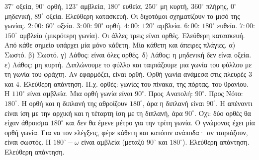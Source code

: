  $37^\circ$ οξεία, $90^\circ$ ορθή, $123^\circ$ αμβλεία, $180^\circ$ ευθεία, $250^\circ$ μη κυρτή, $360^\circ$ πλήρης, $0^\circ$ μηδενική, $89^\circ$ οξεία.
 Ελεύθερη κατασκευή. Οι διχοτόμοι σχηματίζουν το μισό της γωνίας.
 $2{:}00$: $60^\circ$ οξεία. $3{:}00$: $90^\circ$ ορθή. $4{:}00$: $120^\circ$ αμβλεία. $6{:}00$: $180^\circ$ ευθεία. $7{:}00$: $150^\circ$ αμβλεία (μικρότερη γωνία).
 Οι άλλες τρεις είναι ορθές.
 Ελεύθερη κατασκευή. Από κάθε σημείο υπάρχει μία μόνο κάθετη.
 Μία κάθετη και άπειρες πλάγιες.
 α) Σωστό. β) Σωστό. γ) Λάθος: είναι όλες ορθές. δ) Λάθος: η μηδενική δεν είναι οξεία. ε) Λάθος: μη κυρτή.
 Διπλώνουμε το φύλλο και ταιριάζουμε μια γωνία του φύλλου με τη γωνία του φράχτη. Αν εφαρμόζει, είναι ορθή.
 Ορθή γωνία ανάμεσα στις πλευρές $3$ και $4$.
 Ελεύθερη απάντηση. Π.χ. ορθές: γωνίες του πίνακα, της πόρτας, του θρανίου.
 Η $110^\circ$ είναι αμβλεία. Μια ορθή γωνία είναι $90^\circ$.
 Προς Ανατολή: $90^\circ$. Προς Νότο: $180^\circ$.
 Η ορθή και η διπλανή της αθροίζουν $180^\circ$, άρα η διπλανή είναι $90^\circ$. Η απέναντι είναι ίση με την αρχική και η τέταρτη ίση με τη διπλανή, άρα $90^\circ$.
 Όχι: δύο ορθές θα είχαν άθροισμα $180^\circ$ και δεν θα έμενε μέτρο για την τρίτη γωνία.
 Ο γνώμονας έχει μία ορθή γωνία. Για να τον ελέγξεις, φέρε κάθετη και κατόπιν ανάποδα· αν ταιριάζουν, είναι σωστός.
 Η $180^\circ-\omega$ είναι αμβλεία (μεταξύ $90^\circ$ και $180^\circ$).
 Ελεύθερη απάντηση.
 Ελεύθερη απάντηση.
